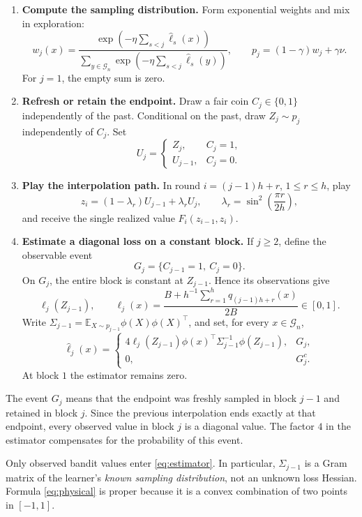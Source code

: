 \documentclass[11pt]{article}
\theoremstyle{definition}
\newcommand{\E}{\mathbb E}
\begin{document}
\begin{enumerate}[leftmargin=*,itemsep=5pt]
\item \textbf{Compute the sampling distribution.} Form exponential weights and mix in exploration:
\[
 w_j(x)=\frac{\exp(-\eta\sum_{s<j}\widehat\ell_s(x))}
 {\sum_{y\in\mathcal G_n}\exp(-\eta\sum_{s<j}\widehat\ell_s(y))},
 \qquad p_j=(1-\gamma)w_j+\gamma\nu.
\]
For $j=1$, the empty sum is zero.
\item \textbf{Refresh or retain the endpoint.} Draw a fair coin $C_j\in\{0,1\}$ independently of the past. Conditional on the past, draw $Z_j\sim p_j$ independently of $C_j$. Set
\[
 U_j=\begin{cases}Z_j,&C_j=1,\\ U_{j-1},&C_j=0.\end{cases}
\]
\item \textbf{Play the interpolation path.} In round $i=(j-1)h+r$, $1\leq r\leq h$, play
\begin{equation}\label{eq:physical}
 z_i=(1-\lambda_r)U_{j-1}+\lambda_r U_j,
 \qquad \lambda_r=\sin^2\!\left(\frac{\pi r}{2h}\right),
\end{equation}
and receive the single realized value $F_i(z_{i-1},z_i)$.
\item \textbf{Estimate a diagonal loss on a constant block.} If $j\geq2$, define the observable event
\[
 G_j=\{C_{j-1}=1,\ C_j=0\}.
\]
On $G_j$, the entire block is constant at $Z_{j-1}$. Hence its observations give
\[
 \ell_j(Z_{j-1}),\qquad
 \ell_j(x)=\frac{B+h^{-1}\sum_{r=1}^h q_{(j-1)h+r}(x)}{2B}\in[0,1].
\]
Write $\Sigma_{j-1}=\E_{X\sim p_{j-1}}\phi(X)\phi(X)^\top$, and set, for every $x\in\mathcal G_n$,
\begin{equation}\label{eq:estimator}
 \widehat\ell_j(x)=
 \begin{cases}
 4\ell_j(Z_{j-1})\phi(x)^\top\Sigma_{j-1}^{-1}\phi(Z_{j-1}),&G_j,\\
 0,&G_j^c.
 \end{cases}
\end{equation}
At block $1$ the estimator remains zero.
\end{enumerate}

The event $G_j$ means that the endpoint was freshly sampled in block $j-1$ and retained in block $j$. Since the previous interpolation ends exactly at that endpoint, every observed value in block $j$ is a diagonal value. The factor $4$ in the estimator compensates for the probability of this event.

Only observed bandit values enter \eqref{eq:estimator}. In particular, $\Sigma_{j-1}$ is a Gram matrix of the learner's \emph{known sampling distribution}, not an unknown loss Hessian. Formula \eqref{eq:physical} is proper because it is a convex combination of two points in $[-1,1]$.
\end{document}
